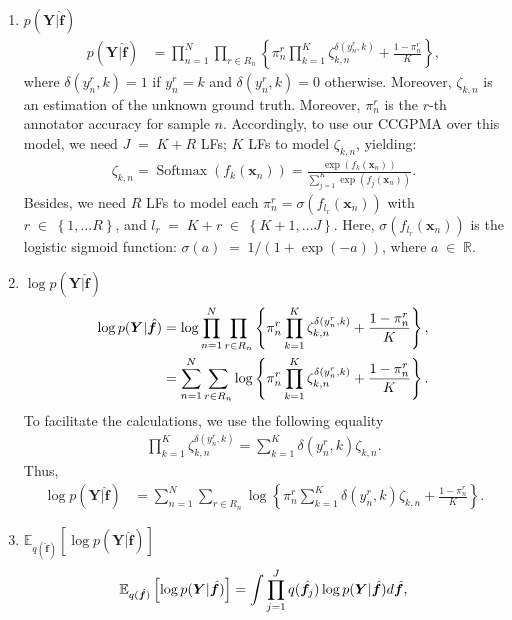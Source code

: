\documentclass[9pt]{article}
\providecommand{\ve}[1]{{\bm{#1}}}%
\providecommand{\mat}[1]{{\bm{#1}}} %
\newcommand{\Real}{\mathbb{R}}
\DeclareMathOperator{\en}{\!\,\in\!\,}
\DeclareMathOperator{\igual}{\!\,=\!\,}
\providecommand{\ve}[1]{{\mathbf{#1}}}
\providecommand{\mat}[1]{{\mathbf{#1}}}
\begin{document}
\begin{enumerate}
	\item $ p(\mat{Y}|\hat{\ve{f}})$
	\begin{align}
    \label{eq:ClasLik}
 p(\mat{Y}|\hat{\ve{f}}) &= \prod^N_{n=1}\prod_{r\in R_n}\left\{\pi_n^r\prod_{k=1}^{K}\zeta_{k,n}^{\delta(y_n^r,k)} + \frac{1-\pi_n^r}{K}  \right\},
    \end{align}
    where $\delta(y_n^r,k)=1$ if $y_n^r=k$ and $\delta(y_n^r,k)=0$ otherwise. Moreover, $\zeta_{k,n}$ is an estimation of the unknown ground truth. Moreover, $\pi_n^r$ is the $r$-th annotator accuracy for sample $n$. Accordingly, to use our CCGPMA over this model, we need $J\igual K+R$ LFs; $K$ LFs to model $\zeta_{k,n}$, yielding:
    \begin{align}
    \zeta_{k,n} =\operatorname{Softmax}(f_k(\ve{x}_n))= \frac{\exp(f_k(\ve{x}_n))}{\sum_{j=1}^{K}\exp(f_j(\ve{x}_n))}.
    \end{align}
    Besides, we need $R$ LFs to model each ${\pi}_n^r=\sigma(f_{l_r}(\ve{x}_n))$ with $r\en \left\{1, \dots R\right\}$, and $l_r \igual K+r \en \left\{K+1, \dots J\right\}$. Here, $\sigma(f_{l_r}(\ve{x}_n))$ is the logistic sigmoid function: $\sigma(a)\igual{1}/{(1+\exp(-a))}$, where $a\en\Real.$ 
	\item $\log p(\mat{Y}|\hat{\ve{f}})$
	\begin{align}
	\notag \log p(\mat{Y}|\hat{\ve{f}}) &= \log \prod^N_{n=1}\prod_{r\in R_n}\left\{\pi_n^r\prod_{k=1}^{K}\zeta_{k,n}^{\delta(y_n^r,k)} + \frac{1-\pi_n^r}{K}  \right\},\\
	&=\sum^N_{n=1}\sum_{r\in R_n}\log\left\{\pi_n^r\prod_{k=1}^{K}\zeta_{k,n}^{\delta(y_n^r,k)} + \frac{1-\pi_n^r}{K}  \right\}.
	\end{align}
	To facilitate the calculations, we use the following equality
	\begin{align}
	    \prod_{k=1}^{K}\zeta_{k,n}^{\delta(y_n^r,k)} = \sum_{k=1}^{K}\delta(y_n^r,k)\zeta_{k,n}.
	\end{align}
	Thus,
	\begin{align}
	\log p(\mat{Y}|\hat{\ve{f}}) &= \sum^N_{n=1}\sum_{r\in R_n}\log\left\{\pi_n^r\sum_{k=1}^{K}\delta(y_n^r,k)\zeta_{k,n} + \frac{1-\pi_n^r}{K}  \right\}.
	\end{align}
	\item $\mathbb{E}_{q(\hat{\ve{f}})}\left[\log p(\mat{Y}|\hat{\ve{f}})\right]$
	\begin{align}
	\notag \mathbb{E}_{q(\hat{\ve{f}})}\left[\log p(\mat{Y}|\hat{\ve{f}})\right] &=\int \prod_{j=1}^{J}q(\hat{\ve{f}}_j)\log p(\mat{Y}|\hat{\ve{f}})d\hat{\ve{f}}, \\

\end{align}
\end{enumerate}
\end{document}
